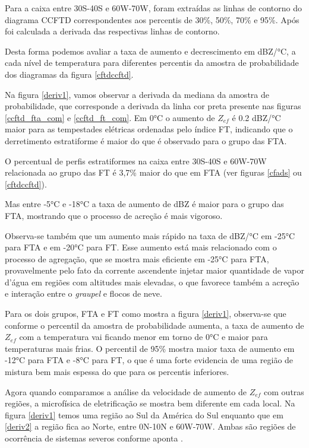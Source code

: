 Para a caixa entre 30S-40S e 60W-70W, foram extraídas as linhas de contorno do diagrama CCFTD correspondentes aos percentis de 30\%, 50\%, 70\% e 95\%. Após foi calculada a derivada das respectivas linhas de contorno.

Desta forma podemos avaliar a taxa de aumento e decrescimento em dBZ/°C, a cada nível de temperatura para diferentes percentis da amostra de probabilidade dos diagramas da figura \ref{cftdccftd}.

Na figura \ref{deriv1}, vamos observar a derivada da mediana da amostra de probabilidade, que corresponde a derivada da linha cor preta presente nas figuras \ref{ccftd_fta_com} e \ref{ccftd_ft_com}. Em 0°C o aumento de $Z_{ef}$ é 0.2 dBZ/°C maior para as tempestades elétricas ordenadas pelo índice FT, indicando que o derretimento estratiforme é maior do que é observado para o grupo das FTA.

O percentual de perfis estratiformes na caixa entre  30S-40S e 60W-70W relacionada ao grupo das FT é 3,7\% maior do que em FTA (ver figuras \ref{cfads} ou \ref{cftdccftd}).  

Mas entre -5°C e -18°C a taxa de aumento de dBZ é maior para o grupo das FTA, mostrando que o processo de acreção é mais vigoroso. 

Observa-se também que um aumento mais rápido na taxa de dBZ/°C em -25°C para FTA e em -20°C para FT. Esse aumento está mais relacionado com o processo de agregação, que se mostra mais eficiente em -25°C para FTA, provavelmente pelo fato da corrente ascendente injetar maior quantidade de vapor d'água em regiões com altitudes mais elevadas, o que favorece também a acreção e interação entre o \textit{graupel} e flocos de neve. 

Para os dois grupos, FTA e FT como mostra a figura \ref{deriv1}, observa-se que conforme o percentil da amostra de probabilidade aumenta, a taxa de aumento de $Z_{ef}$ com a temperatura vai ficando menor em torno de 0°C e maior para temperaturas mais frias. O percentil de 95\% mostra maior taxa de aumento em -12°C para FTA e -8°C para FT, o que é uma forte evidencia de uma região de mistura bem mais espessa do que para os percentis inferiores. 

Agora quando comparamos a análise da velocidade de aumento de $Z_{ef}$ com outras regiões, a microfísica de eletrificação se mostra bem diferente em cada local. Na figura \ref{deriv1} temos uma região ao Sul da América do Sul enquanto que em \ref{deriv2} a região fica ao Norte, entre 0N-10N e 60W-70W. Ambas são regiões de ocorrência de sistemas severos conforme aponta \cite{cecil2005}.	 

